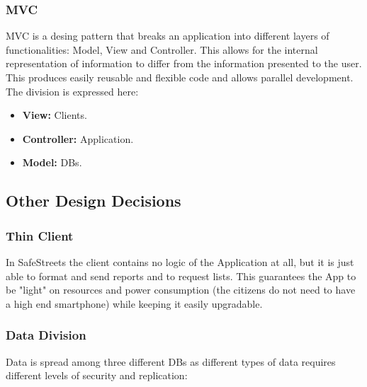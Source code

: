\subsubsection{MVC}

MVC is a desing pattern that breaks an application into different layers	of functionalities:	Model, View and Controller.
This allows for the internal representation of information to differ from the information presented to the user. 
This produces easily reusable and flexible code and allows parallel development. The division is expressed here:

\begin{itemize}
    \item \textbf{View:} Clients.
    \item \textbf{Controller:} Application.
    \item \textbf{Model:} DBs.
    
    
\end{itemize}

\subsection{Other Design Decisions}

\subsubsection{Thin Client}

In SafeStreets the client contains no logic of the Application at all, but it is just able to format and send reports and to request lists.
This guarantees the App to be "light" on resources and power consumption (the citizens do not need to have a high end smartphone) while keeping it easily upgradable.

\subsubsection{Data Division}

Data is spread among three different DBs as different types of data requires different levels of security and replication:

